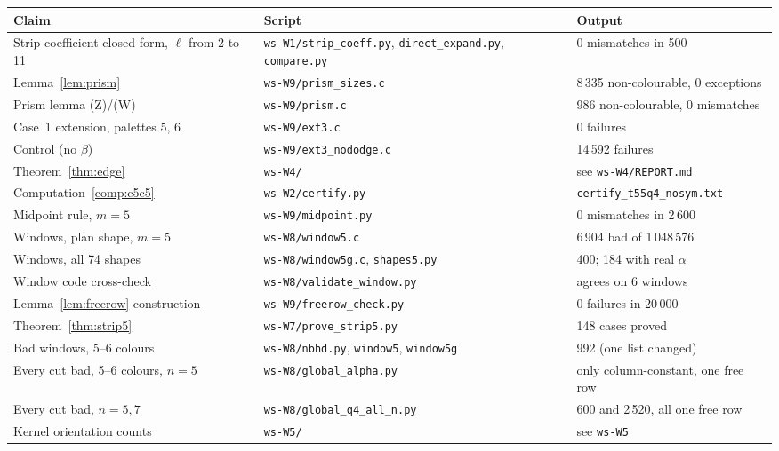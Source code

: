 \documentclass[11pt]{article}
\theoremstyle{plain}
\theoremstyle{definition}
\theoremstyle{remark}
\begin{document}
\begin{center}\small
\begin{tabular}{@{}p{}p{}p{}@{}}
\toprule
Claim & Script & Output\\
\midrule
Strip coefficient closed form, $\ell$ from 2 to 11 & \texttt{ws-W1/strip\_coeff.py}, \texttt{direct\_expand.py}, \texttt{compare.py} & 0 mismatches in 500\\
Lemma~\ref{lem:prism} & \texttt{ws-W9/prism\_sizes.c} & 8\,335 non-colourable, 0 exceptions\\
Prism lemma (Z)/(W) & \texttt{ws-W9/prism.c} & 986 non-colourable, 0 mismatches\\
Case~1 extension, palettes 5, 6 & \texttt{ws-W9/ext3.c} & 0 failures\\
Control (no $\beta$) & \texttt{ws-W9/ext3\_nododge.c} & 14\,592 failures\\
Theorem~\ref{thm:edge} & \texttt{ws-W4/} & see \texttt{ws-W4/REPORT.md}\\
Computation~\ref{comp:c5c5} & \texttt{ws-W2/certify.py} & \texttt{certify\_t55q4\_nosym.txt}\\
Midpoint rule, $m = 5$ & \texttt{ws-W9/midpoint.py} & 0 mismatches in 2\,600\\
Windows, plan shape, $m = 5$ & \texttt{ws-W8/window5.c} & 6\,904 bad of 1\,048\,576\\
Windows, all 74 shapes & \texttt{ws-W8/window5g.c}, \texttt{shapes5.py} & 400; 184 with real $\alpha$\\
Window code cross-check & \texttt{ws-W8/validate\_window.py} & agrees on 6 windows\\
Lemma~\ref{lem:freerow} construction & \texttt{ws-W9/freerow\_check.py} & 0 failures in 20\,000\\
Theorem~\ref{thm:strip5} & \texttt{ws-W7/prove\_strip5.py} & 148 cases proved\\
Bad windows, 5--6 colours & \texttt{ws-W8/nbhd.py}, \texttt{window5}, \texttt{window5g} & 992 (one list changed)\\
Every cut bad, 5--6 colours, $n = 5$ & \texttt{ws-W8/global\_alpha.py} & only column-constant, one free row\\
Every cut bad, $n = 5, 7$ & \texttt{ws-W8/global\_q4\_all\_n.py} & 600 and 2\,520, all one free row\\
Kernel orientation counts & \texttt{ws-W5/} & see \texttt{ws-W5}\\
\bottomrule
\end{tabular}
\end{center}
\end{document}
